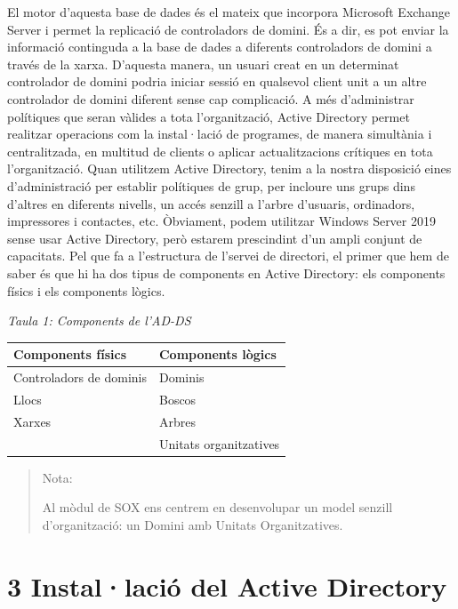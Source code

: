 \documentclass[
  a4paper,
]{article}
\begin{document}
El motor d'aquesta base de dades és el mateix que incorpora Microsoft
Exchange Server i permet la replicació de controladors de domini. És a
dir, es pot enviar la informació continguda a la base de dades a
diferents controladors de domini a través de la xarxa. D'aquesta manera,
un usuari creat en un determinat controlador de domini podria iniciar
sessió en qualsevol client unit a un altre controlador de domini
diferent sense cap complicació. A més d'administrar polítiques que seran
vàlides a tota l'organització, Active Directory permet realitzar
operacions com la instal·lació de programes, de manera simultània i
centralitzada, en multitud de clients o aplicar actualitzacions
crítiques en tota l'organització. Quan utilitzem Active Directory, tenim
a la nostra disposició eines d'administració per establir polítiques de
grup, per incloure uns grups dins d'altres en diferents nivells, un
accés senzill a l'arbre d'usuaris, ordinadors, impressores i contactes,
etc. Òbviament, podem utilitzar Windows Server 2019 sense usar Active
Directory, però estarem prescindint d'un ampli conjunt de capacitats.
Pel que fa a l'estructura de l'servei de directori, el primer que hem de
saber és que hi ha dos tipus de components en Active Directory: els
components físics i els components lògics.

\emph{Taula 1: Components de l'AD-DS}

\begin{longtable}[]{@{}ll@{}}
\toprule\noalign{}
Components físics & Components lògics \\
\midrule\noalign{}
\endhead
\bottomrule\noalign{}
\endlastfoot
Controladors de dominis & Dominis \\
Llocs & Boscos \\
Xarxes & Arbres \\
& Unitats organitzatives \\
\end{longtable}

\begin{quote}
Nota:

Al mòdul de SOX ens centrem en desenvolupar un model senzill
d'organització: un Domini amb Unitats Organitzatives.
\end{quote}

\section{3 Instal·lació del Active
Directory}\label{installaciuxf3-del-active-directory}
\end{document}
